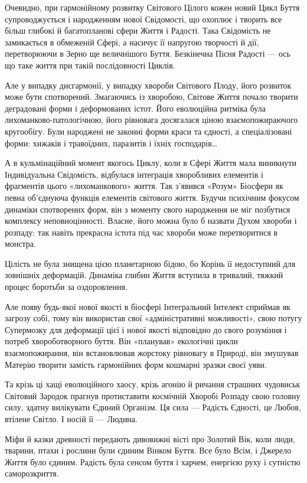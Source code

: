 Очевидно, при гармонійному розвитку Світового Цілого кожен новий Цикл Буття
супроводжується і народженням нової Свідомості, що охоплює і творить все більш
глибокі й багатопланові сфери Життя і Радості. Така Свідомість не замикається в
обмеженій Сфері, а насичує її напругою творчості й дії, перетворюючи в Зерно ще
величнішого Буття. Безкінечна Пісня Радості — ось що таке життя при такій
послідовності Циклів.

Але у випадку дисгармонії, у випадку хвороби Світового Плоду, його розвиток
може бути спотворений. Змагаючись із хворобою, Світове Життя почало творити
деградовані форми і деформованих істот. Його еволюційна ритміка була
лихоманково-патологічною, його рівновага досягалася ціною взаємопожираючого
кругообігу. Були народжені не законні форми краси та єдності, а спеціалізовані
форми: хижаків і травоїдних, паразитів і їхніх господарів…

А в кульмінаційний момент якогось Циклу, коли в Сфері Життя мала виникнути
Індивідуальна Свідомість, відбулася інтеграція хворобливих елементів і
фрагментів цього «лихоманкового» життя. Так з’явився «Розум» Біосфери як певна
об’єднуюча функція елементів світового життя. Будучи психічним фокусом динаміки
спотворених форм, він з моменту свого народження не міг позбутися комплексу
неповноцінності. Власне, його можна було б назвати Духом хвороби і розпаду: так
навіть прекрасна істота під час хвороби може перетворитися в монстра.

Цілість не була знищена цією планетарною бідою, бо Корінь її недоступний для
зовнішніх деформацій. Динаміка глибин Життя вступила в тривалий, тяжкий процес
боротьби за оздоровлення.

Але появу будь-якої нової якості в біосфері Інтегральний Інтелект сприймав як
загрозу собі, тому він використав свої «адміністративні можливості», свою
потугу Супермозку для деформації цієї і нової якості відповідно до свого
розуміння і потреб хвороботворного буття. Він «планував» екологічні цикли
взаємопожирання, він встановлював жорстоку рівновагу в Природі, він змушував
Матерію творити замість гармонійних форм кошмарні зразки своєї уяви.

Та крізь ці хащі еволюційного хаосу, крізь агонію й ричання страшних чудовиськ
Світовий Зародок прагнув протиставити космічній Хворобі Розпаду свою головну
силу, здатну вилікувати Єдиний Організм. Ця сила — Радість Єдності, це Любов,
втілене Світло. І носій її — Людина.

Міфи й казки древності передають дивовижні вісті про Золотий Вік, коли люди,
тварини, птахи і рослини були єдиним Вінком Буття. Все було Всім, і Джерело
Життя було єдиним. Радість була сенсом буття і харчем, енергією руху і сутністю
саморозкриття.

